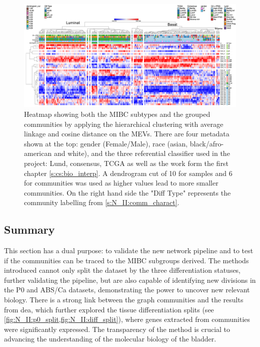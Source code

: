 \begin{figure}
    \includegraphics[width=1.0\textwidth,keepaspectratio]{Sections/Network_II/resources/non_tum/iMev_3_3_cs_13_horiz.png}
    
    \caption[Heatmap: MIBC subgroups derived from non-tumour network]{Heatmap showing both the MIBC subtypes and the grouped communities by applying the hierarchical clustering with average linkage and cosine distance on the MEVs. There are four metadata shown at the top: gender (Female/Male), race (asian, black/afro-american and white), and the three referential classifier used in the project: Lund, consensus, TCGA \citep{Marzouka2018-ge,Kamoun2020-tj,Robertson2017-mg} as well as the work form the first chapter \cref{s:cs:bio_interp}. A dendrogram cut of 10 for samples and 6 for communities was used as higher values lead to more smaller communities. On the right hand side the "Diff Type" represents the community labelling from \cref{s:N_II:comm_charact}.
    }
    \label{fig:N_II:tum_morph}
\end{figure}


\subsection{Summary}


This section has a dual purpose: to validate the new network pipeline and to test if the communities can be traced to the MIBC subgroups derived. The methods introduced cannot only split the dataset by the three differentiation statuses, further validating the pipeline, but are also capable of identifying new divisions in the P0 and ABS/Ca datasets, demonstrating the power to uncover new relevant biology. There is a strong link between the graph communities and the results from \acrlong{dea}, which further explored the tissue differentiation splits (see \cref{fig:N_II:p0_split,fig:N_II:diff_split}), where genes extracted from communities were significantly expressed. The transparency of the method is crucial to advancing the understanding of the molecular biology of the bladder.


